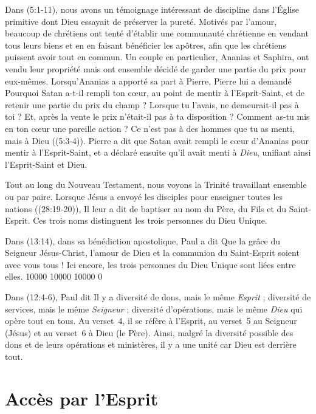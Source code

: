 Dans (5:1-11), nous avons un témoignage intéressant de
 discipline dans l'Église primitive dont Dieu essayait de préserver
 la pureté.
 Motivés par l'amour, beaucoup de chrétiens ont tenté d'établir une
 communauté chrétienne en vendant tous leurs biens et en en faisant
 bénéficier les apôtres, afin que les chrétiens puissent avoir tout en
 commun. Un couple en particulier, Ananias et Saphira, ont vendu leur
 propriété mais ont ensemble décidé de garder une partie du prix pour
 eux-mêmes. Lorsqu'Ananias a apporté sa part à Pierre, Pierre lui a
 demandé\frcolon{} \Og Pourquoi Satan a-t-il rempli ton cœur, au point de mentir
 à l'Esprit-Saint, et de retenir une partie du prix du champ ? Lorsque tu
 l'avais, ne demeurait-il pas à toi ? Et, après la vente le prix n'était-il
 pas à ta disposition ?
 Comment as-tu mis en ton cœur une pareille action ?
 Ce n'est pas à des hommes que tu as menti, mais à Dieu \Fg{}
 ((5:3-4)).  
 Pierre a dit que Satan avait rempli le cœur d'Ananias pour mentir
 à l'Esprit-Saint, et a déclaré ensuite qu'il avait menti à \emph{Dieu}, unifiant
 ainsi l'Esprit-Saint et Dieu.

Tout au long du Nouveau Testament, nous voyons la Trinité travaillant ensemble
 ou par paire. Lorsque Jésus a envoyé les disciples pour enseigner toutes
 les nations ((28:19-20)), Il leur a dit de baptiser au nom
 du Père, du Fils et du Saint-Esprit. Ces trois noms distinguent les trois
 personnes du Dieu Unique.

Dans (13:14), dans sa bénédiction apostolique, Paul a dit\frcolon{}
 \Og Que la grâce du Seigneur Jésus-Christ, l'amour de Dieu et la communion
 du Saint-Esprit soient avec vous tous ! \Fg{}
 Ici encore, les trois personnes du Dieu Unique sont liées entre elles.
 \begingroup{} 10000 10000 10000 0
 \par\endgroup

Dans (12:4-6), Paul dit\frcolon{}
 \Og Il y a diversité de dons, mais le même \emph{Esprit} ; diversité de services,
 mais le même \emph{Seigneur} ; diversité d'opérations, mais le
 même \emph{Dieu} qui opère tout en tous. \Fg{}
 Au verset~4, il se réfère à l'Esprit,
 au verset~5 au Seigneur (Jésus)
 et au verset~6 à Dieu (le Père).
 Ainsi, malgré la diversité possible des dons et de leurs opérations
 et ministères, il y a une unité car Dieu est derrière tout.


\section{Acc\`es par l'Esprit}

